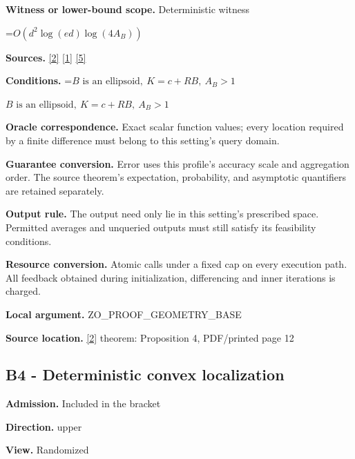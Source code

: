 \documentclass[10pt,a4paper]{article}
\newcommand{\AtlasMath}[1]{\par\begingroup\centering\setbox0=\hbox{$\displaystyle #1$}\ifdim\wd0>1.4\linewidth\typeout{ATLAS WIDE FORMULA: \the\wd0}\fi\ifdim\wd0>\linewidth\resizebox{\linewidth}{!}{\box0}\else\box0\fi\par\endgroup}
\newcommand{\AtlasInlineMath}[1]{\begingroup\setbox0=\hbox{$#1$}\ifdim\wd0>.4\linewidth\endgroup\AtlasMath{#1}\else\endgroup$#1$\fi}
\begin{document}
\textbf{Witness or lower-bound scope.} Deterministic witness



\AtlasMath{O(d^2\log(ed)\log(4A_B))}


\textbf{Sources.} \href{https://arxiv.org/html/2607.16558v2}{[2]} \href{https://arxiv.org/html/2610.00345v1}{[1]} \href{https://www.mathnet.ru/php/archive.phtml?jrnid=mzm&option_lang=eng&paperid=1697&wshow=paper}{[5]}



\textbf{Conditions.} \AtlasInlineMath{B\text{ is an ellipsoid},\ K=c+RB,\ A_B>1}



\textbf{Oracle correspondence.} Exact scalar function values; every location required by a finite difference must belong to this setting's query domain.



\textbf{Guarantee conversion.} Error uses this profile's accuracy scale and aggregation order. The source theorem's expectation, probability, and asymptotic quantifiers are retained separately.



\textbf{Output rule.} The output need only lie in this setting's prescribed space. Permitted averages and unqueried outputs must still satisfy its feasibility conditions.



\textbf{Resource conversion.} Atomic calls under a fixed cap on every execution path. All feedback obtained during initialization, differencing and inner iterations is charged.



\textbf{Local argument.} ZO\_PROOF\_GEOMETRY\_BASE



\textbf{Source location.} \href{https://arxiv.org/html/2607.16558v2}{[2]} theorem: Proposition 4, PDF/printed page 12



\subsection{B4 - Deterministic convex localization}


\textbf{Admission.} Included in the bracket



\textbf{Direction.} upper



\textbf{View.} Randomized
\end{document}

